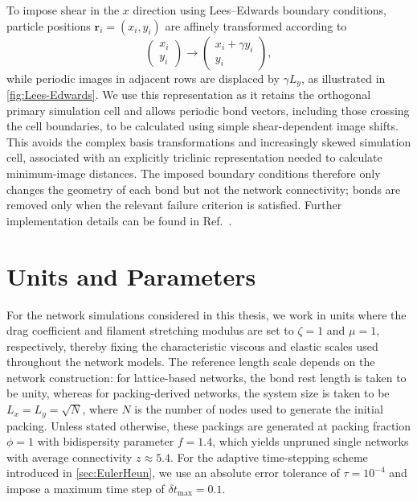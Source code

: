 To impose shear in the $x$ direction using Lees--Edwards boundary conditions, particle positions $\mathbf{r}_i=(x_i,y_i)$ are affinely transformed according to
\begin{equation}
    \begin{pmatrix}
        x_i \\ y_i
    \end{pmatrix}
    \to
    \begin{pmatrix}
        x_i+\gamma y_i \\ y_i
    \end{pmatrix},
\end{equation}
while periodic images in adjacent rows are displaced by $\gamma L_y$, as illustrated in \cref{fig:Lees-Edwards}. We use this representation as it retains the orthogonal primary simulation cell and allows periodic bond vectors, including those crossing the cell boundaries, to be calculated using simple shear-dependent image shifts. This avoids the complex basis transformations and increasingly skewed simulation cell, associated with an explicitly triclinic representation needed to calculate minimum-image distances. The imposed boundary conditions therefore only changes the geometry of each bond but not the network connectivity; bonds are removed only when the relevant failure criterion is satisfied. Further implementation details can be found in Ref.~\cite{allen_computer_2017}.

\section{Units and Parameters}
For the network simulations considered in this thesis, we work in units where the drag coefficient and filament stretching modulus are set to $\zeta = 1$ and $\mu = 1$, respectively, thereby fixing the characteristic viscous and elastic scales used throughout the network models. The reference length scale depends on the network construction: for lattice-based networks, the bond rest length is taken to be unity, whereas for packing-derived networks, the system size is taken to be $L_x = L_y = \sqrt{N}$, where $N$ is the number of nodes used to generate the initial packing. Unless stated otherwise, these packings are generated at packing fraction $\phi = 1$ with bidispersity parameter $f = 1.4$, which yields unpruned single networks with average connectivity $z \approx 5.4$. For the adaptive time-stepping scheme introduced in \cref{sec:EulerHeun}, we use an absolute error tolerance of $\tau = 10^{-4}$ and impose a maximum time step of $\delta t_{\max} = 0.1$.

